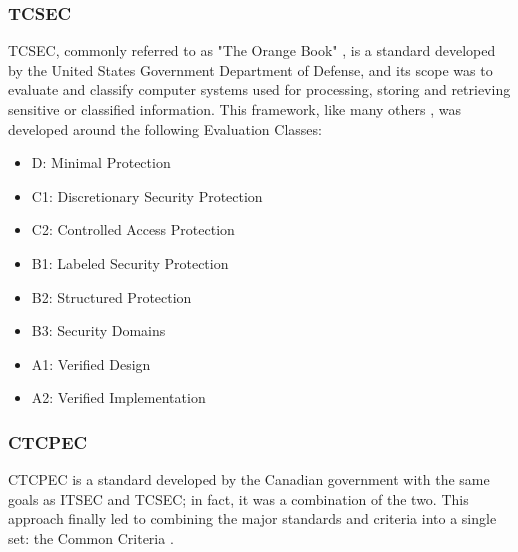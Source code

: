 \subsubsection{TCSEC}
TCSEC, commonly referred to as "The Orange Book" \cite{orangeBook}\cite{orangeBookDeath}, is a standard developed by the United States Government Department of Defense, and its scope was to evaluate and classify computer systems used for processing, storing and retrieving sensitive or classified information. This framework, like many others \cite{infrastructure2002common}\cite{ITSEC}, was developed around the following Evaluation Classes: 
\begin{itemize}
    \item D: Minimal Protection
    \item C1: Discretionary Security Protection
    \item C2: Controlled Access Protection
    \item B1: Labeled Security Protection
    \item B2: Structured Protection
    \item B3: Security Domains
    \item A1: Verified Design
    \item A2: Verified Implementation
\end{itemize}

\subsubsection{CTCPEC}
CTCPEC is a standard developed by the Canadian government with the same goals as ITSEC and TCSEC; in fact, it was a combination of the two. This approach finally led to combining the major standards and criteria into a single set: the Common Criteria \cite{CTCPEC}.

